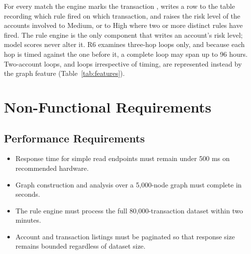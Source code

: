 For every match the engine marks the transaction , writes a row to the  table recording which rule fired on which transaction, and raises the risk level of the accounts involved to Medium, or to High where two or more distinct rules have fired. The rule engine is the only component that writes an account's risk level; model scores never alter it. R6 examines three-hop loops only, and because each hop is timed against the one before it, a complete loop may span up to 96 hours. Two-account loops, and loops irrespective of timing, are represented instead by the  graph feature (Table~\ref{tab:features}).

\section{Non-Functional Requirements}

\subsection{Performance Requirements}
\begin{itemize}
  \item Response time for simple read endpoints must remain under 500 ms on recommended hardware.
  \item Graph construction and analysis over a 5,000-node graph must complete in seconds.
  \item The rule engine must process the full 80,000-transaction dataset within two minutes.
  \item Account and transaction listings must be paginated so that response size remains bounded regardless of dataset size.
\end{itemize}

